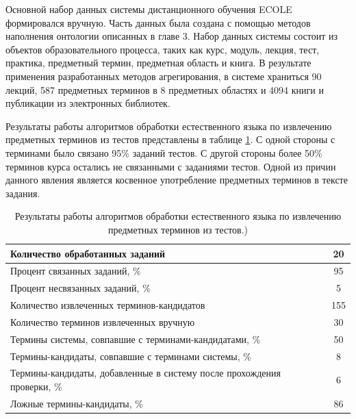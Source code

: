 Основной набор данных системы дистанционного обучения ECOLE формировался вручную. Часть данных была создана с помощью методов наполнения онтологии описанных в главе 3. Набор данных системы состоит из объектов образовательного процесса, таких как курс, модуль, лекция, тест, практика, предметный термин, предметная область и книга. В результате применения разработанных методов агрегирования, в системе храниться 90 лекций, 587 предметных терминов в 8 предметных областях и 4094 книги и публикации из электронных библиотек.   

Результаты работы алгоритмов обработки естественного языка по извлечению предметных терминов из тестов представлены в таблице \ref{table:2}. С одной стороны с терминами было связано 95\% заданий тестов. С другой стороны более 50\% терминов курса остались не связанными с заданиями тестов. Одной из причин данного явления является косвенное употребление предметных терминов в тексте задания.

\begin{table}[h!]
\centering
\caption{Результаты работы алгоритмов обработки естественного языка по извлечению предметных терминов из тестов.)}
\label{table:2}
\begin{tabular}{ |p{12cm}|c|  }
\hline Количество обработанных заданий & 20 \\
\hline Процент связанных заданий, \% & 95 \\
\hline Процент несвязанных заданий, \% & 5 \\
\hline Количество извлеченных терминов-кандидатов & 155 \\
\hline Количество терминов извлеченных вручную & 30 \\
\hline Термины системы, совпавшие с терминами-кандидатами, \% & 50 \\
\hline Термины-кандидаты, совпавшие с терминами системы, \% & 8 \\
\hline Термины-кандидаты, добавленные в систему после прохождения проверки, \%  & 6 \\
\hline Ложные термины-кандидаты, \% & 86 \\
\hline
\end{tabular}
\end{table}  



